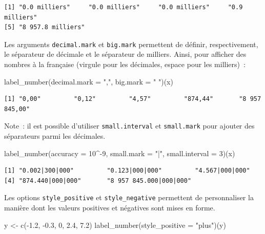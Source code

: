 \documentclass[
  letterpaper,
  DIV=11,
  numbers=noendperiod,
  oneside]{scrreprt}
\newenvironment{Shaded}{\begin{snugshade}}{\end{snugshade}}
\newcommand{\AttributeTok}[1]{\textcolor[rgb]{0.40,0.45,0.13}{#1}}
\newcommand{\DecValTok}[1]{\textcolor[rgb]{0.68,0.00,0.00}{#1}}
\newcommand{\FloatTok}[1]{\textcolor[rgb]{0.68,0.00,0.00}{#1}}
\newcommand{\FunctionTok}[1]{\textcolor[rgb]{0.28,0.35,0.67}{#1}}
\newcommand{\NormalTok}[1]{\textcolor[rgb]{0.00,0.23,0.31}{#1}}
\newcommand{\OtherTok}[1]{\textcolor[rgb]{0.00,0.23,0.31}{#1}}
\newcommand{\SpecialCharTok}[1]{\textcolor[rgb]{0.37,0.37,0.37}{#1}}
\newcommand{\StringTok}[1]{\textcolor[rgb]{0.13,0.47,0.30}{#1}}
\begin{document}
\begin{verbatim}
[1] "0.0 milliers"     "0.0 milliers"     "0.0 milliers"     "0.9 milliers"    
[5] "8 957.8 milliers"
\end{verbatim}

Les arguments \texttt{decimal.mark} et \texttt{big.mark} permettent de
définir, respectivement, le séparateur de décimale et le séparateur de
milliers. Ainsi, pour afficher des nombres à la française (virgule pour
les décimales, espace pour les milliers)~:

\begin{Shaded}
\begin{Highlighting}[]
\FunctionTok{label\_number}\NormalTok{(}\AttributeTok{decimal.mark =} \StringTok{","}\NormalTok{, }\AttributeTok{big.mark =} \StringTok{" "}\NormalTok{)(x)}
\end{Highlighting}
\end{Shaded}

\begin{verbatim}
[1] "0,00"         "0,12"         "4,57"         "874,44"       "8 957 845,00"
\end{verbatim}

Note~: il est possible d'utiliser \texttt{small.interval} et
\texttt{small.mark} pour ajouter des séparateurs parmi les décimales.

\begin{Shaded}
\begin{Highlighting}[]
\FunctionTok{label\_number}\NormalTok{(}\AttributeTok{accuracy =} \DecValTok{10}\SpecialCharTok{\^{}{-}}\DecValTok{9}\NormalTok{, }\AttributeTok{small.mark =} \StringTok{"|"}\NormalTok{, }\AttributeTok{small.interval =} \DecValTok{3}\NormalTok{)(x)}
\end{Highlighting}
\end{Shaded}

\begin{verbatim}
[1] "0.002|300|000"         "0.123|000|000"         "4.567|000|000"        
[4] "874.440|000|000"       "8 957 845.000|000|000"
\end{verbatim}

Les options \texttt{style\_positive} et \texttt{style\_negative}
permettent de personnaliser la manière dont les valeurs positives et
négatives sont mises en forme.

\begin{Shaded}
\begin{Highlighting}[]
\NormalTok{y }\OtherTok{\textless{}{-}} \FunctionTok{c}\NormalTok{(}\SpecialCharTok{{-}}\FloatTok{1.2}\NormalTok{, }\SpecialCharTok{{-}}\FloatTok{0.3}\NormalTok{, }\DecValTok{0}\NormalTok{, }\FloatTok{2.4}\NormalTok{, }\FloatTok{7.2}\NormalTok{)}
\FunctionTok{label\_number}\NormalTok{(}\AttributeTok{style\_positive =} \StringTok{"plus"}\NormalTok{)(y)}
\end{Highlighting}
\end{Shaded}
\end{document}
